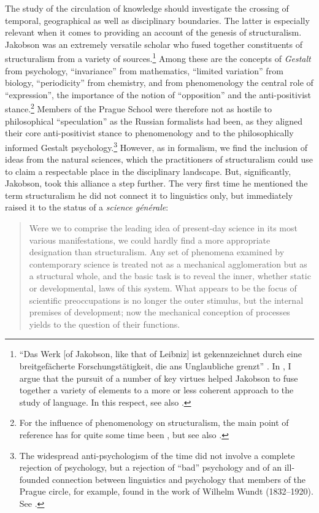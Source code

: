 \documentclass[output=paper]{langscibook}
\begin{document}
The study of the circulation of knowledge should investigate the crossing of temporal, geographical as well as disciplinary boundaries. The latter is especially relevant when it comes to providing an account of the genesis of structuralism. Jakobson was an extremely versatile scholar who fused together constituents of structuralism from a variety of sources.\footnote{``Das Werk [of Jakobson, like that of Leibniz] ist gekennzeichnet durch eine breitgefächerte Forschungstätigkeit, die ans Unglaubliche grenzt'' \citep[17]{Holenstein1975}. In \citet{Karstens2017lonely}, I argue that the pursuit of a number of key virtues helped Jakobson to fuse together a variety of elements to a more or less coherent approach to the study of language. In this respect, see also \citet{Karstens2017blog}.} Among these are the concepts of \emph{Gestalt} from psychology, ``invariance'' from mathematics, ``limited variation'' from biology, ``periodicity'' from chemistry, and from phenomenology the central role of ``expression'', the importance of the notion of ``opposition'' and the anti-positivist stance.\footnote{For the influence of phenomenology on structuralism, the main point of reference has for quite some time been \citet{Holenstein1975}, but see also \citet{Flack2016}.} Members of the Prague School were therefore not as hostile to philosophical ``speculation'' as the Russian formalists had been, as they aligned their core anti-positivist stance to phenomenology and to the philosophically informed Gestalt psychology.\footnote{The widespread anti-psychologism of the time did not involve a complete rejection of psychology, but a rejection of ``bad'' psychology and of an ill-founded connection between linguistics and psychology that members of the Prague circle, for example, found in the work of Wilhelm Wundt (1832--1920). See \citet[139]{Toman1995}.} However, as in formalism, we find the inclusion of ideas from the natural sciences, which the practitioners of structuralism could use to claim a respectable place in the disciplinary landscape. But, significantly, Jakobson, took this alliance a step further. The very first time he mentioned the term structuralism he did not connect it to linguistics only, but immediately raised it to the status of a \emph{science générale}:

\begin{quotation}
Were we to comprise the leading idea of present-day science in its most various manifestations, we could hardly find a more appropriate designation than structuralism. Any set of phenomena examined by contemporary science is treated not as a mechanical agglomeration but as a structural whole, and the basic task is to reveal the inner, whether static or developmental, laws of this system. What appears to be the focus of scientific preoccupations is no longer the outer stimulus, but the internal premises of development; now the mechanical conception of processes yields to the question of their functions. \citep[11]{Jakobson1929}
\end{quotation}
\end{document}
